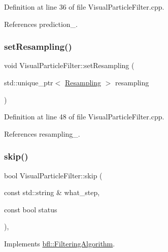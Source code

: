 Definition at line 36 of file Visual\+Particle\+Filter.\+cpp.



References prediction\+\_\+.

\mbox{\label{classbfl_1_1VisualParticleFilter_a4e42410d311df91ee14e31790ada3674}} 
\subsubsection{\texorpdfstring{set\+Resampling()}{setResampling()}}
{\footnotesize\ttfamily void Visual\+Particle\+Filter\+::set\+Resampling (\begin{DoxyParamCaption}\item[{std\+::unique\+\_\+ptr$<$ \mbox{\hyperlink{classbfl_1_1Resampling}{Resampling}} $>$}]{resampling }\end{DoxyParamCaption})}



Definition at line 48 of file Visual\+Particle\+Filter.\+cpp.



References resampling\+\_\+.

\mbox{\label{classbfl_1_1VisualParticleFilter_aab68e455c645bc1b7b8c3c2b476c2f9c}} 
\subsubsection{\texorpdfstring{skip()}{skip()}}
{\footnotesize\ttfamily bool Visual\+Particle\+Filter\+::skip (\begin{DoxyParamCaption}\item[{const std\+::string \&}]{what\+\_\+step,  }\item[{const bool}]{status }\end{DoxyParamCaption})\hspace{0.3cm}{\ttfamily [override]}, {\ttfamily [virtual]}}



Implements \mbox{\hyperlink{classbfl_1_1FilteringAlgorithm_ac8a718a614905d89d6a43bbbc70d68b2}{bfl\+::\+Filtering\+Algorithm}}.



